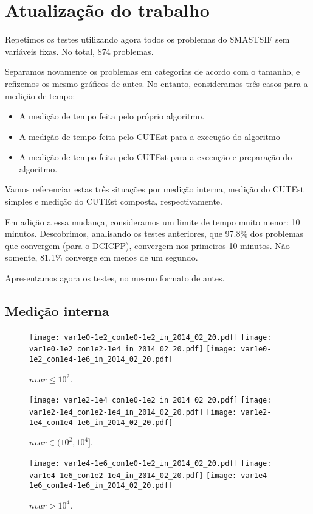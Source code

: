 \documentclass{article}
\begin{document}
\section{Atualização do trabalho}

Repetimos os testes utilizando agora todos os problemas do \$MASTSIF sem
variáveis fixas. No total, 874 problemas.

Separamos novamente os problemas em categorias de acordo com o tamanho, e
refizemos os mesmo gráficos de antes. No entanto, consideramos três casos para a
medição de tempo:
\begin{itemize}
  \item A medição de tempo feita pelo próprio algoritmo.
  \item A medição de tempo feita pelo CUTEst para a execução do algoritmo
  \item A medição de tempo feita pelo CUTEst para a execução e preparação do
    algoritmo.
\end{itemize}
Vamos referenciar estas três situações por medição interna, medição do CUTEst
simples e medição do CUTEst composta, respectivamente.

Em adição a essa mudança, consideramos um limite de tempo muito menor: 10
minutos. Descobrimos, analisando os testes anteriores, que 97.8\% dos problemas
que convergem (para o DCICPP), convergem nos primeiros 10 minutos.
Não somente, 81.1\% converge em menos de um segundo.

Apresentamos agora os testes, no mesmo formato de antes.

\subsection{Medição interna}

\begin{figure}[H]
\centering
\texttt{[image: var1e0-1e2\_con1e0-1e2\_in\_2014\_02\_20.pdf]}
\texttt{[image: var1e0-1e2\_con1e2-1e4\_in\_2014\_02\_20.pdf]}
\texttt{[image: var1e0-1e2\_con1e4-1e6\_in\_2014\_02\_20.pdf]}
\caption{ $nvar \leq 10^2$. }
\label{fig:nvar_small}
\end{figure}
\begin{figure}[H]
\centering
\texttt{[image: var1e2-1e4\_con1e0-1e2\_in\_2014\_02\_20.pdf]}
\texttt{[image: var1e2-1e4\_con1e2-1e4\_in\_2014\_02\_20.pdf]}
\texttt{[image: var1e2-1e4\_con1e4-1e6\_in\_2014\_02\_20.pdf]}
\caption{ $nvar \in (10^2,10^4]$. }
\label{fig:nvar_medium}
\end{figure}
\begin{figure}[H]
\centering
\texttt{[image: var1e4-1e6\_con1e0-1e2\_in\_2014\_02\_20.pdf]}
\texttt{[image: var1e4-1e6\_con1e2-1e4\_in\_2014\_02\_20.pdf]}
\texttt{[image: var1e4-1e6\_con1e4-1e6\_in\_2014\_02\_20.pdf]}
\caption{ $nvar > 10^4$. }
\label{fig:nvar_big}
\end{figure}
\end{document}
